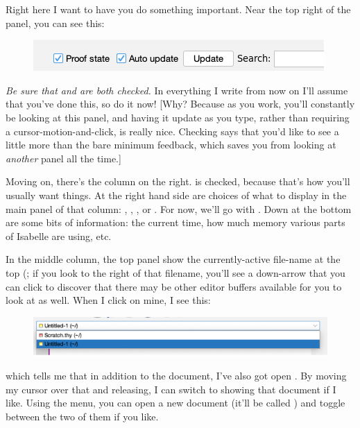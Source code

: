 Right here I want to have you do something important. Near the top right of the 
 panel, you can see this:
\begin{figure}[h]
    \centering
    \includegraphics[width=0.75\linewidth]{TEXT/C01//Images/image.png}
\end{figure}
\textit{Be sure that  and  are both checked.} In everything I write from now on I'll assume that you've done this, so do it now! [Why? Because as you work, you'll constantly be looking at this panel, and having it update as you type, rather than requiring a cursor-motion-and-click, is really nice. Checking  says that you'd like to see a little more than the bare minimum feedback, which saves you from looking at \textit{another} panel all the time.]

Moving on, there's the column on the right.  is checked, because that's how you'll usually want things. At the right hand side are choices of what to display in the main panel of that column: , , , or . For now, we'll go with . Down at the bottom are some bits of information: the current time, how much memory various parts of Isabelle are using, etc. 

In the middle column, the top panel show the currently-active file-name at the top (; if you look to the right of that filename, you'll see a down-arrow that you can click to discover that there may be other editor buffers available for you to look at as well. When I click on mine, I see this:
\begin{figure}
    \centering
    \includegraphics[width=1\linewidth]{TEXT/C01//Images/file-list.png}
\end{figure}
which tells me that in addition to the  document, I've also got open . By moving my cursor over that and releasing, I can switch to showing that document if I like. Using the  menu, you can open a new document (it'll be called ) and toggle between the two of them if you like.

